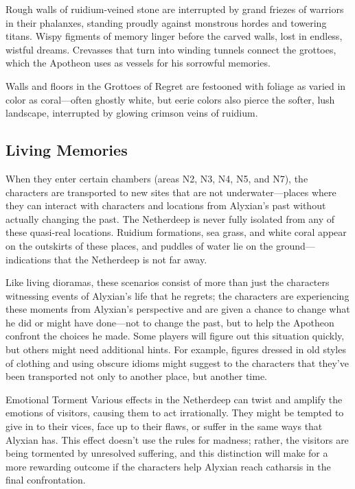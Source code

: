 \documentclass[10pt,a4paper,twoside,bg=print,twocolumn,openany,nodeprecatedcode]{dndbook}
\begin{document}
Rough walls of ruidium-veined stone are interrupted by grand friezes of warriors in their phalanxes, standing proudly against monstrous hordes and towering titans. Wispy figments of memory linger before the carved walls, lost in endless, wistful dreams. Crevasses that turn into winding tunnels connect the grottoes, which the Apotheon uses as vessels for his sorrowful memories.

Walls and floors in the Grottoes of Regret are festooned with foliage as varied in color as coral—often ghostly white, but eerie colors also pierce the softer, lush landscape, interrupted by glowing crimson veins of ruidium.

\subsection{Living Memories}
When they enter certain chambers (areas N2, N3, N4, N5, and N7), the characters are transported to new sites that are not underwater—places where they can interact with characters and locations from Alyxian's past without actually changing the past. The Netherdeep is never fully isolated from any of these quasi-real locations. Ruidium formations, sea grass, and white coral appear on the outskirts of these places, and puddles of water lie on the ground—indications that the Netherdeep is not far away.

Like living dioramas, these scenarios consist of more than just the characters witnessing events of Alyxian's life that he regrets; the characters are experiencing these moments from Alyxian's perspective and are given a chance to change what he did or might have done—not to change the past, but to help the Apotheon confront the choices he made. Some players will figure out this situation quickly, but others might need additional hints. For example, figures dressed in old styles of clothing and using obscure idioms might suggest to the characters that they've been transported not only to another place, but another time.

\begin{DndSidebar}[float=!b]{Emotional Torment}
Various effects in the Netherdeep can twist and amplify the emotions of visitors, causing them to act irrationally. They might be tempted to give in to their vices, face up to their flaws, or suffer in the same ways that Alyxian has. This effect doesn't use the rules for madness; rather, the visitors are being tormented by unresolved suffering, and this distinction will make for a more rewarding outcome if the characters help Alyxian reach catharsis in the final confrontation.



\end{DndSidebar}
\end{document}
